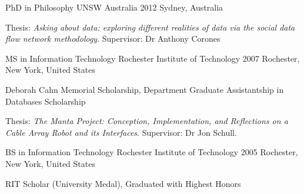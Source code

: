 

\begin{cventries}

  \cventry
    {PhD in Philosophy} %
    {UNSW Australia} %
    {2012} %
    {Sydney, Australia} %
    {
      \begin{cvitems} %
        \item {Thesis: \textit{Asking about data: exploring different realities of data via the social data flow network methodology}. Supervisor: Dr Anthony Corones}
      \end{cvitems}
    }
 \cventry
    {MS in Information Technology} %
    {Rochester Institute of Technology} %
    {2007} %
    {Rochester, New York, United States} %
    {
      \begin{cvitems} %
        \item {Deborah Cahn Memorial Scholarship, Department Graduate Assistantship in Databases Scholarship}
        \item {Thesis: \textit{The Manta Project: Conception, Implementation, and Reflections on a Cable Array Robot and its Interfaces}. Supervisor: Dr Jon Schull.}
      \end{cvitems}
    }
     \cventry
    {BS in Information Technology} %
    {Rochester Institute of Technology} %
    {2005} %
    {Rochester, New York, United States} %
    {
      \begin{cvitems} %
        \item {RIT Scholar (University Medal), Graduated with Highest Honors}
      \end{cvitems}
    }
\end{cventries}
